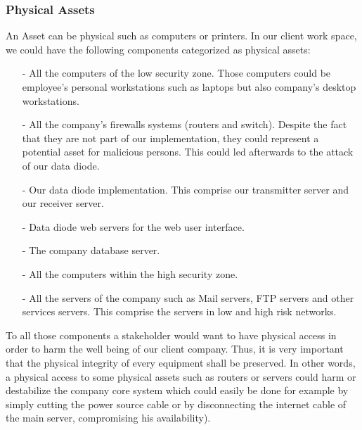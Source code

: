 \documentclass[a4paper,10pt]{article}
\begin{document}
\subsubsection{Physical Assets}
An Asset can be physical such as computers or printers. In our client work space, we could have the following components categorized as physical assets:
\begin{enumerate}
\item[-] All the computers of the low security zone. Those computers could be employee's personal workstations such as laptops but also company's desktop workstations.
\item[-] All the company's firewalls systems (routers and switch). Despite the fact that they are not part of our implementation, they could represent a potential asset for malicious persons. This could led afterwards to the attack of our data diode.
\item[-] Our data diode implementation. This comprise our transmitter server and our receiver server.
\item[-] Data diode web servers for the web user interface.
\item[-] The company database server.
\item[-] All the computers within the high security zone.
\item[-] All the servers of the company such as Mail servers, FTP servers and other services servers. This comprise the servers in low and high risk networks.

\end{enumerate}
To all those components a stakeholder would want to have physical access in order to harm the well being of our client company. Thus, it is very important that the physical integrity of every equipment shall be preserved. In other words, a physical access to some physical assets such as routers or servers could harm or destabilize the company core system which could easily be done for example by simply cutting the power source cable or by disconnecting the internet cable of the main server, compromising his availability).
\end{document}
